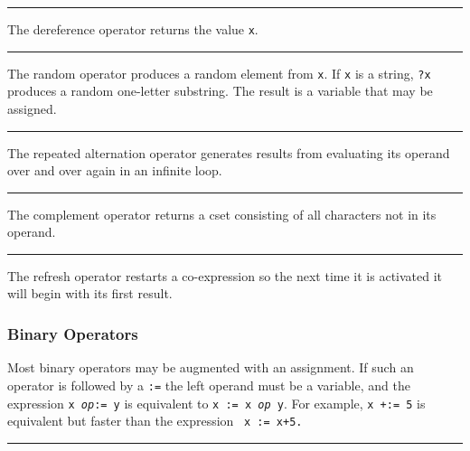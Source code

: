 \bigskip\hrule\vspace{0.1cm}

\noindent
The dereference operator returns the value
\texttt{x}.

\bigskip\hrule\vspace{0.1cm}

\noindent
The random operator produces a random element
from \texttt{x}. If \texttt{x} is a string, \texttt{?x} produces a
random one-letter substring. The result is a variable that may be
assigned.

\bigskip\hrule\vspace{0.1cm}

\noindent
The repeated alternation operator generates
results from evaluating its operand over and over again in an infinite
loop.

\bigskip\hrule\vspace{0.1cm}

\noindent
The complement operator returns a cset
consisting of all characters not in its operand.

\bigskip\hrule\vspace{0.1cm}

\noindent
{}The refresh operator restarts a
co-expression so the next time it is activated it will begin with its
first result.

\subsubsection[Binary Operators]{Binary Operators}

Most binary operators may be augmented with an
assignment. If such an operator is followed
by a \texttt{:=} the left operand must be a variable, and the
expression \texttt{x }\texttt{\textit{op}}\texttt{:= y} is equivalent
to \texttt{x := x }\texttt{\textit{op}}\texttt{ y}. For example,
\texttt{x +:= 5} is equivalent but faster than the expression
\ \texttt{x := x+5.}

\bigskip\hrule\vspace{0.1cm}

